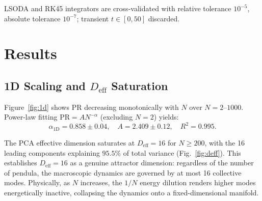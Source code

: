 \documentclass[aps,pre,12pt]{revtex4-2}
\begin{document}
LSODA and RK45 integrators are cross-validated with relative tolerance $10^{-5}$, absolute tolerance $10^{-7}$; transient $t \in [0, 50]$ discarded.

\section{Results}

\subsection{1D Scaling and $D_{\text{eff}}$ Saturation}

Figure~\ref{fig:1d} shows PR decreasing monotonically with $N$ over $N = 2$--$1000$. Power-law fitting $\text{PR} = A N^{-\alpha}$ (excluding $N=2$) yields:
\begin{equation}
    \alpha_{\text{1D}} = 0.858 \pm 0.04, \quad A = 2.409 \pm 0.12, \quad R^2 = 0.995.
\end{equation}

The PCA effective dimension saturates at $D_{\text{eff}} = 16$ for $N \ge 200$, with the 16 leading components explaining $95.5\%$ of total variance (Fig.~\ref{fig:deff}). This establishes $D_{\text{eff}} = 16$ as a genuine attractor dimension: regardless of the number of pendula, the macroscopic dynamics are governed by at most 16 collective modes. Physically, as $N$ increases, the $1/N$ energy dilution renders higher modes energetically inactive, collapsing the dynamics onto a fixed-dimensional manifold.
\end{document}
